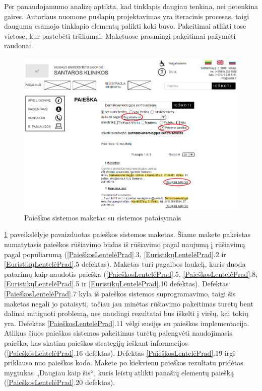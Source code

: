 \documentclass{VUMIFPSkursinis}
\begin{document}
Per panaudojamumo analizę aptikta, kad tinklapis daugiau tenkina, nei netenkina gaires. Autoriaus nuomone puslapių projektavimas yra iteracinis procesas, taigi dauguma esamojo tinklapio elementų palikti koki buvo. Pakeitimai atlikti tose vietose, kur pastebėti trūkumai. Maketuose prasmingi pakeitimai pažymėti raudonai.

\begin{figure}[H]
    \centering
    \includegraphics[scale=0.65]{img/PaieškosPrototipas}
    \caption{Paieškos sistemos maketas su sistemos pataisymais}
    \label{img:PaieškosPrototipas}
\end{figure}

\ref{img:PaieškosPrototipas} paveikslėlyje pavaizduotas paieškos sistemos maketas. Šiame makete pakeistas numatytasis paieškos rūšiavimo būdas iš rūšiavimo pagal naujumą į rūšiavimą pagal populiarumą (\ref{PaieškosLentelėPrad}.3, \ref{EuristikųLentelėPrad}.2 ir \ref{EuristikųLentelėPrad}.5 defektas). Maketas turi pagalbos laukelį, kuris duoda patarimų kaip naudotis paieška (\ref{PaieškosLentelėPrad}.5, \ref{PaieškosLentelėPrad}.8, \ref{EuristikųLentelėPrad}.5  ir \ref{EuristikųLentelėPrad}.10 defektas). Defektas \ref{PaieškosLentelėPrad}.7 kyla iš paieškos sistemos suprogramavimo, taigi šis maketas negali jo pataisyti, tačiau jau minėtas rūšiavimo pakeitimas turėtų bent dalinai mitiguoti problemą, nes naudingi rezultatai bus iškelti į viršų, kai tokių yra. Defektas \ref{PaieškosLentelėPrad}.11 vėlgi susijęs su paieškos implementacija. Atlikus šiuos paieškos sistemos pakeitimus turėtų palengvėti naudojimasis paieška, kas skatina paieškos strategiją ieškant informacijos (\ref{PaieškosLentelėPrad}.16 defektas). Defektas \ref{PaieškosLentelėPrad}.19 irgi priklauso nuo paieškos kodo. Makete po kiekvienu paieškos rezultatu pridėtas mygtukas „Daugiau kaip šis“, kuris leistų atlikti panašių elementų paiešką (\ref{PaieškosLentelėPrad}.20 defektas).
\end{document}
